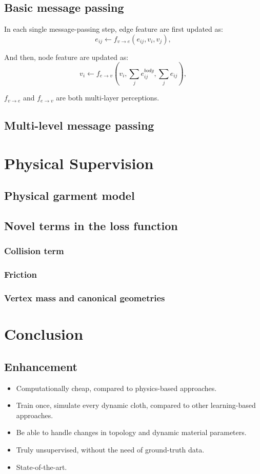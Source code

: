 \documentclass{article}
\begin{document}
\subsection{Basic message passing}
\par In each single message-passing step, edge feature are first updated as:
$$
e_{ij} \gets f_{v \rightarrow e}(e_{ij},v_{i},v_{j}) ,
$$
\par And then, node feature are updated as:
$$
v_i \gets f_{e \rightarrow v}(v_i,\sum_{j}e_{ij}^{body},\sum_{j}e_{ij}) , 
$$
\par $f_{v \rightarrow e}$ and $f_{e \rightarrow v}$ are both multi-layer perceptions.
\subsection{Multi-level message passing}
\label{sec:MLMP}

\section{Physical Supervision}
\subsection{Physical garment model}
\subsection{Novel terms in the loss function}
\subsubsection{Collision term}
\subsubsection{Friction}
\subsubsection{Vertex mass and canonical geometries}
\section{Conclusion}
\subsection{Enhancement}
\begin{itemize}
    \item Computationally cheap, compared to physics-based approaches.
    \item Train once, simulate every dynamic cloth, compared to other learning-based approaches.
    \item Be able to handle changes in topology and dynamic material parameters.
    \item Truly unsupervised, without the need of ground-truth data.
    \item State-of-the-art.
\end{itemize}
\end{document}
